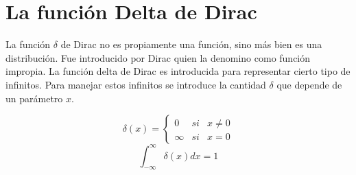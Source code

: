 \documentclass[../main]{subfiles}
\begin{document}
\section{La función Delta de Dirac}
La función $\delta$ de Dirac no es propiamente una función, sino más bien es una distribución. Fue introducido por Dirac quien la denomino como función impropia. 
La función delta de Dirac es introducida para representar cierto tipo de infinitos. Para manejar estos infinitos se introduce la cantidad $\delta$ que depende de un parámetro $x$. \\[0.5cm]
\begin{minipage}{0.5\textwidth}
   \begin{equation}
    \delta(x)=
    \left\{ 
    \begin{array}{lll}
         0 & si & x \neq 0 \\
         \infty & si & x=0 
    \end{array} 
    \right. 
    \end{equation} 
    \begin{equation}
        \int_{-\infty}^{\infty} \delta(x)dx=1
    \end{equation}
\end{minipage}
\begin{minipage}{0.5\textwidth}
  
\end{minipage}\\[0.5cm]
\end{document}
